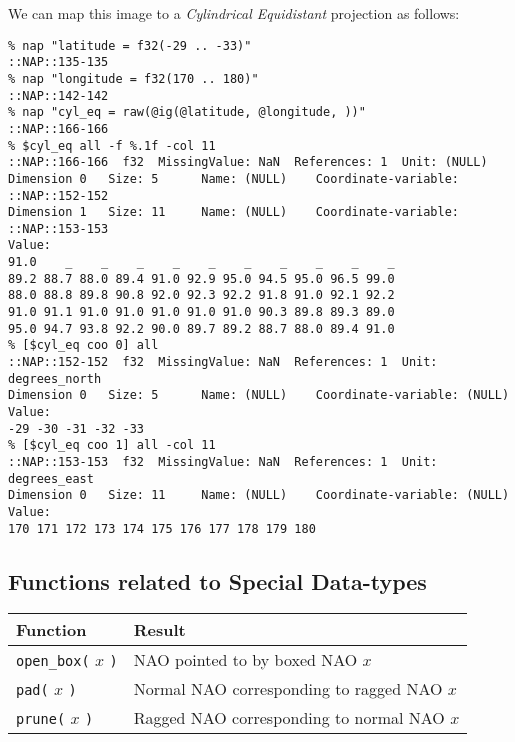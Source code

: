   \par We can map this image to a 
  \textit{Cylindrical Equidistant} projection as follows:
  \begin{verbatim}
% nap "latitude = f32(-29 .. -33)"
::NAP::135-135
% nap "longitude = f32(170 .. 180)"
::NAP::142-142
% nap "cyl_eq = raw(@ig(@latitude, @longitude, ))"
::NAP::166-166
% $cyl_eq all -f %.1f -col 11
::NAP::166-166  f32  MissingValue: NaN  References: 1  Unit: (NULL)
Dimension 0   Size: 5      Name: (NULL)    Coordinate-variable:
::NAP::152-152
Dimension 1   Size: 11     Name: (NULL)    Coordinate-variable:
::NAP::153-153
Value:
91.0    _    _    _    _    _    _    _    _    _    _
89.2 88.7 88.0 89.4 91.0 92.9 95.0 94.5 95.0 96.5 99.0
88.0 88.8 89.8 90.8 92.0 92.3 92.2 91.8 91.0 92.1 92.2
91.0 91.1 91.0 91.0 91.0 91.0 91.0 90.3 89.8 89.3 89.0
95.0 94.7 93.8 92.2 90.0 89.7 89.2 88.7 88.0 89.4 91.0
% [$cyl_eq coo 0] all
::NAP::152-152  f32  MissingValue: NaN  References: 1  Unit:
degrees_north
Dimension 0   Size: 5      Name: (NULL)    Coordinate-variable: (NULL)
Value:
-29 -30 -31 -32 -33
% [$cyl_eq coo 1] all -col 11
::NAP::153-153  f32  MissingValue: NaN  References: 1  Unit:
degrees_east
Dimension 0   Size: 11     Name: (NULL)    Coordinate-variable: (NULL)
Value:
170 171 172 173 174 175 176 177 178 179 180
\end{verbatim}

  \subsection{
    \label{Special-Data-types}Functions related to Special Data-types
  }

  \par

  \begin{tabular}{|l|l|}
    \hline 
      \textbf{Function} & \textbf{Result}
    \\
      \hline 
      \hline 
        \texttt{open\_box(} $x$ \texttt{)} & NAO pointed to by boxed NAO $x$
      \\
      \hline 
        \texttt{pad(} $x$ \texttt{)} & Normal NAO corresponding to ragged NAO $x$
      \\
      \hline 
        \texttt{prune(} $x$ \texttt{)} & Ragged NAO corresponding to normal NAO $x$
      \\
  \hline
\end{tabular}

